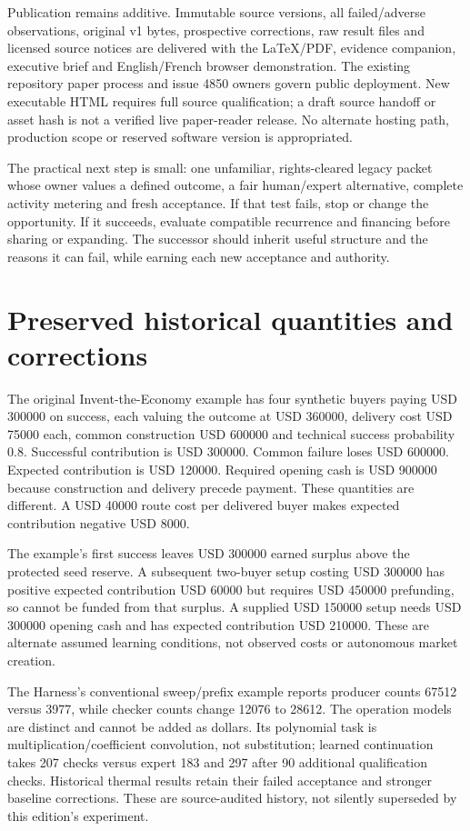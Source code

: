 \documentclass[11pt]{article}
\begin{document}
Publication remains additive. Immutable source versions, all failed/adverse observations, original v1 bytes, prospective corrections, raw result files and licensed source notices are delivered with the LaTeX/PDF, evidence companion, executive brief and English/French browser demonstration. The existing repository paper process and issue 4850 owners govern public deployment. New executable HTML requires full source qualification; a draft source handoff or asset hash is not a verified live paper-reader release. No alternate hosting path, production scope or reserved software version is appropriated.\citep{paperpolicy}

The practical next step is small: one unfamiliar, rights-cleared legacy packet whose owner values a defined outcome, a fair human/expert alternative, complete activity metering and fresh acceptance. If that test fails, stop or change the opportunity. If it succeeds, evaluate compatible recurrence and financing before sharing or expanding. The successor should inherit useful structure and the reasons it can fail, while earning each new acceptance and authority.

\appendix
\section{Preserved historical quantities and corrections}

The original Invent-the-Economy example has four synthetic buyers paying USD 300000 on success, each valuing the outcome at USD 360000, delivery cost USD 75000 each, common construction USD 600000 and technical success probability 0.8. Successful contribution is USD 300000. Common failure loses USD 600000. Expected contribution is USD 120000. Required opening cash is USD 900000 because construction and delivery precede payment. These quantities are different. A USD 40000 route cost per delivered buyer makes expected contribution negative USD 8000.\citep{economy}

The example's first success leaves USD 300000 earned surplus above the protected seed reserve. A subsequent two-buyer setup costing USD 300000 has positive expected contribution USD 60000 but requires USD 450000 prefunding, so cannot be funded from that surplus. A supplied USD 150000 setup needs USD 300000 opening cash and has expected contribution USD 210000. These are alternate assumed learning conditions, not observed costs or autonomous market creation.

The Harness's conventional sweep/prefix example reports producer counts 67512 versus 3977, while checker counts change 12076 to 28612. The operation models are distinct and cannot be added as dollars. Its polynomial task is multiplication/coefficient convolution, not substitution; learned continuation takes 207 checks versus expert 183 and 297 after 90 additional qualification checks. Historical thermal results retain their failed acceptance and stronger baseline corrections. These are source-audited history, not silently superseded by this edition's experiment.\citep{harness,repository}
\end{document}
